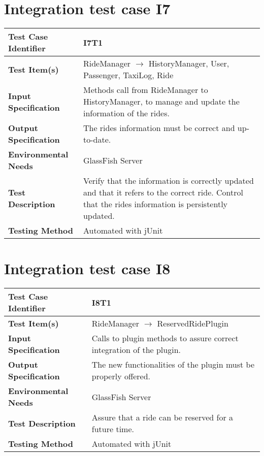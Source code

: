 \vspace{2em}

\section{Integration test case I7}

\begin{tabular}{l p{}}
    \hline
    \textbf{Test Case Identifier} & I7T1\\
    \hline
    \textbf{Test Item(s)} & RideManager $\rightarrow$ HistoryManager, User, Passenger, TaxiLog, Ride \\
    \hline
    \textbf{Input Specification} & Methods call from RideManager to HistoryManager, to manage and update the information of the rides.\\
    \hline
    \textbf{Output Specification} & The rides information must be correct and up-to-date.\\
    \hline
    \textbf{Environmental Needs} & GlassFish Server\\
    \hline
    \textbf{Test Description} & Verify that the information is correctly updated and that it refers to the correct ride. Control that the rides information is persistently updated.\\
    \hline
    \textbf{Testing Method} & Automated with jUnit \\
    \hline
\end{tabular}

\vspace{2em}

\section{Integration test case I8}

\begin{tabular}{l p{}}
    \hline
    \textbf{Test Case Identifier} & I8T1\\
    \hline
    \textbf{Test Item(s)} & RideManager $\rightarrow$ ReservedRidePlugin\\
    \hline
    \textbf{Input Specification} & Calls to plugin methods to assure correct integration of the plugin.\\
    \hline
    \textbf{Output Specification} & The new functionalities of the plugin must be properly offered.\\
    \hline
    \textbf{Environmental Needs} & GlassFish Server\\
    \hline
    \textbf{Test Description} & Assure that a ride can be reserved for a future time.\\
    \hline
    \textbf{Testing Method} & Automated with jUnit \\
    \hline
\end{tabular}

